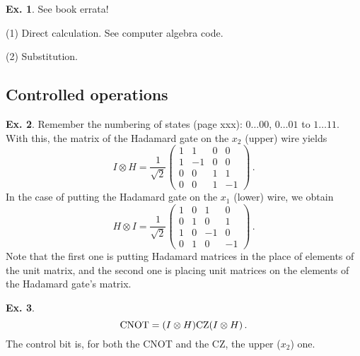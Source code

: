 \documentclass[a4paper,12pt]{article}
\theoremstyle{definition}
\newtheorem{exercise}{Ex.}[section]
\begin{document}
\begin{exercise} See book errata!

 (1) Direct calculation. See computer algebra code.
 
 (2) Substitution.
\end{exercise}

\subsection{Controlled operations}\label{sec:controlledOperations}

\begin{exercise}
 Remember the numbering of states (page xxx): $0\dots00$, $0\dots01$ to $1\dots11$. With this, the matrix of the Hadamard gate on the $x_2$ (upper) wire yields
 \[
  I\otimes H =
  \frac{1}{\sqrt{2}}
  \begin{pmatrix}
    1 &  1 & 0 &  0\\
    1 & -1 & 0 &  0\\
    0 &  0 & 1 &  1\\
    0 &  0 & 1 & -1
  \end{pmatrix}\,.
 \]
 In the case of putting the Hadamard gate on the $x_1$ (lower) wire, we obtain
 \[ H\otimes I = 
  \frac{1}{\sqrt{2}}
  \begin{pmatrix}
   1 & 0 &  1 & 0\\
   0 & 1 &  0 & 1\\
   1 & 0 & -1 & 0\\
   0 & 1 & 0 & -1
  \end{pmatrix}\,.
 \]
 Note that the first one is putting Hadamard matrices in the place of elements of the unit matrix, and the second one is placing unit matrices on the elements of the Hadamard gate's matrix.
\end{exercise}

\begin{exercise}
 \[
  {\rm CNOT} = (I\otimes H) {\rm CZ} (I\otimes H)\,.
 \]
 The control bit is, for both the CNOT and the CZ, the upper ($x_2$) one.
\end{exercise}
\end{document}
